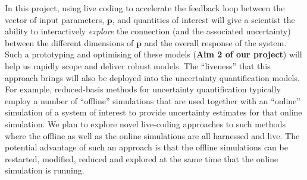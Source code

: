 In this project, using live coding to accelerate the feedback loop between the vector of input parameters,
$\mathbf{p}$,  and quantities of interest  will give a scientist the ability to interactively
\emph{explore} the connection (and the associated uncertainty) between
the different dimensions of $\mathbf{p}$ and the overall response of
the system. Such a prototyping and optimising of these models ({\bf Aim 2 of our project}) will help us rapidly scope and deliver 
robust models. The ``liveness'' that this approach brings will also be deployed 
into the uncertainty quantification models. For example, reduced-basis methods for uncertainty 
quantification typically employ a number of ``offline'' simulations that are used together with an ``online'' simulation of 
a system of interest to provide uncertainty estimates for that online simulation. We plan to explore novel live-coding
approaches to such methods where the offline as well as the online simulations are all harnessed and live. The 
potential advantage of such an approach is that the offline simulations can be restarted, modified, reduced and 
explored at the same time that the online simulation is running. 








